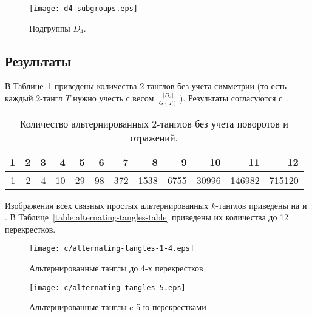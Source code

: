 		\begin{figure}
			\centering
			\texttt{[image: d4-subgroups.eps]}
			\caption{Подгруппы $D_4$.\label{figure:D4-subgroups}}
		\end{figure}

	\subsection{Результаты}

		В Таблице~\ref{table:old-results-table} приведены количества $2$-танглов без учета симметрии (то есть каждый $2$-тангл $T$ нужно
		учесть с весом $\frac{|D_4|}{|G(T)|}$). Результаты согласуются с~\cite{SundbergThistlethwaite1998}.

		\begin{table}[ht]
			\caption{Количество альтернированных $2$-танглов без учета поворотов и отражений.\label{table:old-results-table}}
			\centering
			\begin{tabular}{|r|r|r|r|r|r|r|r|r|r|r|r|}
			\hline
			1 & 2 & 3 &  4 &  5 &  6 &   7 &    8 &    9 &    10 &     11 &     12 \\
			\hline
			1 & 2 & 4 & 10 & 29 & 98 & 372 & 1538 & 6755 & 30996 & 146982 & 715120 \\
			\hline
			\end{tabular}
		\end{table}

		Изображения всех связных простых альтернированных $k$-танглов приведены на  и .
		В Таблице~\ref{table:alternating-tangles-table} приведены их количества до 12 перекрестков.

		\begin{figure}[ht]
			\centering
			\texttt{[image: c/alternating-tangles-1-4.eps]}
			\caption{Альтернированные танглы до 4-х перекрестков\label{figure:tangles14}}
		\end{figure}

		\begin{figure}[ht]
			\centering
			\texttt{[image: c/alternating-tangles-5.eps]}
			\caption{Альтернированные танглы c 5-ю перекрестками\label{figure:tangles5}}
		\end{figure}

